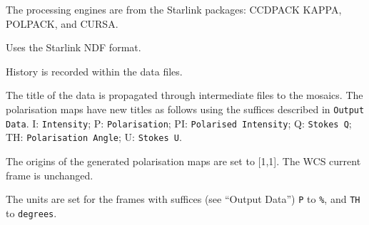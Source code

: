 \documentclass[twoside,11pt]{article}
\newcommand{\htmlref}[2]{#1}
\newcommand{\xref}[3]{#1}
\renewcommand{\_}{\texttt{\symbol{95}}}
\newcommand{\CCDPACK}{{\footnotesize CCDPACK}}
\newcommand{\CURSA}{{\footnotesize CURSA}}
\newcommand{\KAPPA}{{\footnotesize KAPPA}}
\newcommand{\POLPACK}{{\footnotesize POLPACK}}
\newcommand{\sstitem}{\item}
\begin{document}
{{{         \sstitem
         The processing engines are from the Starlink packages: \xref{\CCDPACK}{sun139}{}
         \xref{\KAPPA}{sun95}{}, \xref{\POLPACK}{sun223}{}, and \xref{\CURSA}{sun190}{}.

         \sstitem
         Uses the Starlink NDF format.

         \sstitem
         History is recorded within the data files.

         \sstitem
         The title of the data is propagated through intermediate files
         to the mosaics.  The polarisation maps have new titles as follows
         using the suffices described in {\tt{Output Data}}.  I: {\tt{Intensity}};
         P: {\tt{Polarisation}}; PI: {\tt{Polarised Intensity}}; Q: {\tt{Stokes Q}};
         TH: {\tt{Polarisation Angle}}; U: {\tt{Stokes U}}.

         \sstitem
         The origins of the generated polarisation maps are set to [1,1].
         The WCS current frame is unchanged.

         \sstitem
         The units are set for the frames with suffices (see \htmlref{``Output Data''}{pe_data})
         {\tt{P}} to {\tt{\%}}, and {\tt{TH}} to {\tt{degrees}}.
      }
   }
}
\end{document}
